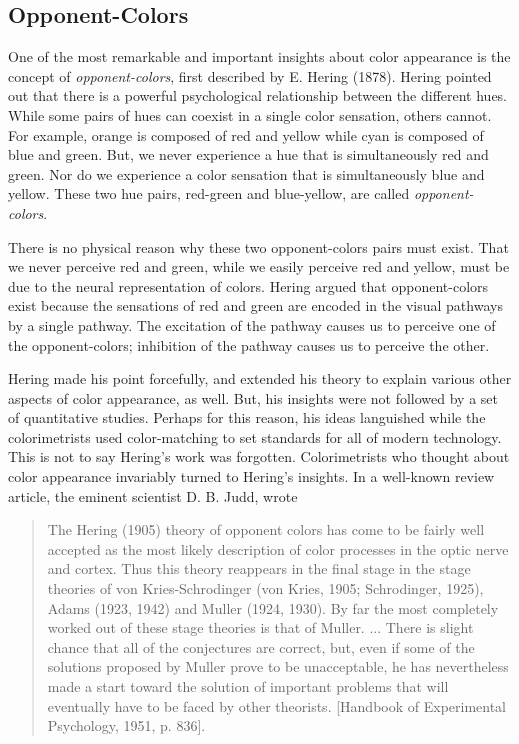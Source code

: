 \subsection*{Opponent-Colors} One of the most remarkable and
important insights about color appearance is the concept of {\em
opponent-colors}, first described by E. Hering (1878).  Hering
pointed out that there is a powerful psychological relationship
between the different hues.  While some pairs of hues can coexist in
a single color sensation, others cannot.  For example, orange is
composed of red and yellow while cyan is composed of blue and green.
But, we never experience a hue that is simultaneously red and green.
Nor do we experience a color sensation that is simultaneously blue
and yellow.  These two hue pairs, red-green and blue-yellow, are
called {\em opponent-colors}.

There is no physical reason why these two opponent-colors pairs
must exist.  That we
never perceive red and green, while we easily perceive red and yellow,
must be due to the neural representation of colors.  Hering argued
that opponent-colors exist because the sensations of red and green are
encoded in the visual pathways by a single pathway.  The excitation of
the pathway causes us to perceive one of the opponent-colors;
inhibition of the pathway causes us to perceive the other.

Hering made his point forcefully, and extended his theory to explain
various other aspects of color appearance, as well.  But, his insights
were not followed by a set of quantitative studies.  Perhaps for this
reason, his ideas languished while the colorimetrists used
color-matching to set standards for all of modern technology.  This is
not to say Hering's work was forgotten.  Colorimetrists who thought
about color appearance invariably turned to Hering's insights.  In a
well-known review article, the eminent scientist D. B. Judd, wrote

\begin{quote}
The Hering (1905) theory of opponent colors has come to be fairly well
accepted as the most likely description of color processes in the
optic nerve and cortex.  Thus this theory reappears in the final stage
in the stage theories of von Kries-Schrodinger (von Kries, 1905;
Schrodinger, 1925), Adams (1923, 1942) and Muller (1924, 1930).  By
far the most completely worked out of these stage theories is that of
Muller. ... There is slight chance that all of the conjectures are
correct, but, even if some of the solutions proposed by Muller prove
to be unacceptable, he has nevertheless made a start toward the
solution of important problems that will eventually have to be faced
by other theorists.  [Handbook of Experimental Psychology, 1951,
p. 836].
\end{quote}

